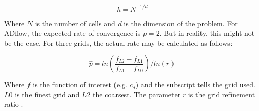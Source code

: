 \begin{equation}
  h = N^{-1/d}
\end{equation}

\noindent Where $N$ is the number of cells and $d$ is the dimension of the
problem.
For ADflow, the expected rate of convergence is $p=2$. But in reality, this
might not be the case. For three grids, the actual rate may be calculated as
follows:

\begin{equation}
  \hat p = ln(\frac{f_{L2} - f_{L1}}{f_{L1} - f_{L0}}) / ln(r)
  \label{eq:conv_rate}
\end{equation}

\noindent Where $f$ is the function of interest (e.g. $c_{d}$) and the subscript
tells the grid used. $L0$ is the finest grid and $L2$ the coarsest. The
parameter $r$ is the grid refinement ratio .\cite{grid_refinement}
